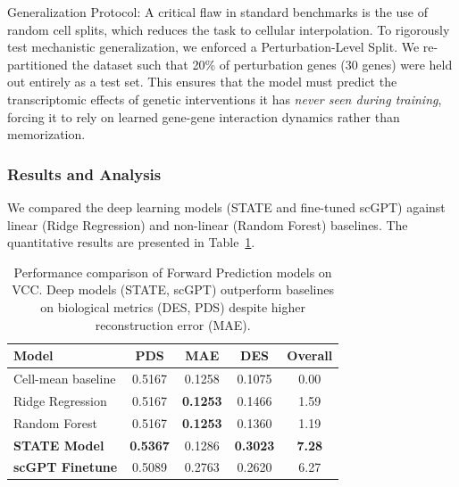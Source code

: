\documentclass[conference]{IEEEtran}
\begin{document}
Generalization Protocol: A critical flaw in standard benchmarks is the use of random cell splits, which reduces the task to cellular interpolation. To rigorously test mechanistic generalization, we enforced a Perturbation-Level Split. We re-partitioned the dataset such that 20\% of perturbation genes (30 genes) were held out entirely as a test set. This ensures that the model must predict the transcriptomic effects of genetic interventions it has \emph{never seen during training}, forcing it to rely on learned gene-gene interaction dynamics rather than memorization.

\subsubsection{Results and Analysis}
We compared the deep learning models (STATE and fine-tuned scGPT) against linear (Ridge Regression) and non-linear (Random Forest) baselines. The quantitative results are presented in Table~\ref{tab:forward_results}.

\begin{table}[h]
\caption{Performance comparison of Forward Prediction models on VCC. Deep models (STATE, scGPT) outperform baselines on biological metrics (DES, PDS) despite higher reconstruction error (MAE).}
\label{tab:forward_results}
\centering
\begin{tabular}{lcccc}
\hline
\textbf{Model} & \textbf{PDS} & \textbf{MAE} & \textbf{DES} & \textbf{Overall} \\
\hline
Cell-mean baseline & 0.5167 & 0.1258 & 0.1075 & 0.00 \\
Ridge Regression & 0.5167 & \textbf{0.1253} & 0.1466 & 1.59 \\
Random Forest & 0.5167 & \textbf{0.1253} & 0.1360 & 1.19 \\
\textbf{STATE Model} & \textbf{0.5367} & 0.1286 & \textbf{0.3023} & \textbf{7.28} \\
\textbf{scGPT Finetune} & 0.5089 & 0.2763 & 0.2620 & 6.27 \\
\hline
\end{tabular}
\end{table}
\end{document}

